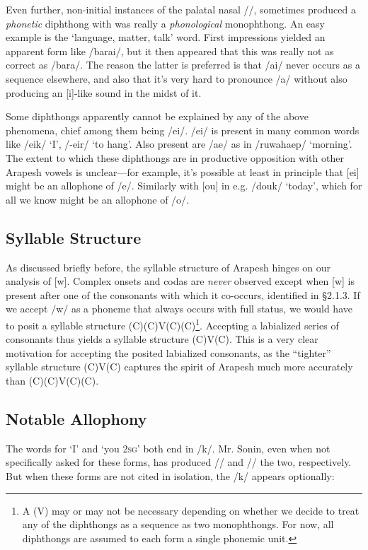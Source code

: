 \documentclass[pdftex,12pt,letterpaper]{article}
\let\ipa\textipa
\begin{document}
 Even further, non-initial instances of the palatal nasal /\ipa{\textltailn}/, sometimes produced a \emph{phonetic} diphthong with was really a \emph{phonological} monophthong. An easy example is the `language, matter, talk' word. First impressions yielded an apparent form like /barai\ipa{\textltailn}/, but it then appeared that this was really not as correct as /bara\ipa{\textltailn}/. The reason the latter is preferred is that /ai/ never occurs as a sequence elsewhere, and also that it's very hard to pronounce /a\ipa{\textltailn}/ without also producing an [i]-like sound in the midst of it.
 
 Some diphthongs apparently cannot be explained by any of the above phenomena, chief among them being /ei/. /ei/ is present in many common words like /eik/ `I', /-eir/ `to hang'. Also present are /ae/ as in /ruwahaep/ `morning'. The extent to which these diphthongs are in productive opposition with other Arapesh vowels is unclear---for example, it's possible at least in principle that [ei] might be an allophone of /e/. Similarly with [ou] in e.g. /douk/ `today', which for all we know might be an allophone of /o/.

 \subsection{Syllable Structure}

 As discussed briefly before, the syllable structure of Arapesh hinges on our analysis of [w]. Complex onsets and codas are \emph{never} observed except when [w] is present after one of the consonants with which it co-occurs, identified in \S 2.1.3. If we accept /w/ as a phoneme that always occurs with full status,  we would have to posit a syllable structure (C)(C)V(C)(C)\footnote{A (V) may or may not be necessary depending on whether we decide to treat any of the diphthongs as a sequence as two monophthongs. For now, all diphthongs are assumed to each form a single phonemic unit.}. Accepting a labialized series of consonants thus yields a syllable structure (C)V(C). This is a very clear motivation for accepting the posited labialized consonants, as the ``tighter'' syllable structure (C)V(C) captures the spirit of Arapesh much more accurately than (C)(C)V(C)(C).

 \subsection{Notable Allophony}

 The words for `I' and `you \textsc{2sg}' both end in /k/. Mr. Sonin, even when not specifically asked for these forms, has produced /\ipa{eik}/ and /\ipa{\textltailn@k}/ the two, respectively. But when these forms are not cited in isolation, the /k/ appears optionally:
\end{document}
